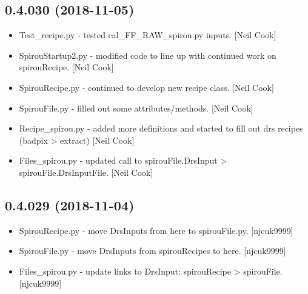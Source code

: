 \documentclass[a4paper,10pt,english]{report}
\begin{document}
\subsection{0.4.030 (2018-11-05)}
\label{\detokenize{misc/changelog:id268}}\begin{itemize}
\item {} 
Test\_recipe.py - tested cal\_FF\_RAW\_spirou.py inputs. {[}Neil Cook{]}

\item {} 
SpirouStartup2.py - modified code to line up with continued work on
spirouRecipe. {[}Neil Cook{]}

\item {} 
SpirouRecipe.py - continued to develop new recipe class. {[}Neil Cook{]}

\item {} 
SpirouFile.py - filled out some attributes/methods. {[}Neil Cook{]}

\item {} 
Recipe\_spirou.py - added more definitions and started to fill out drs
recipes (badpix \textendash{}\textgreater{} extract) {[}Neil Cook{]}

\item {} 
Files\_spirou.py - updated call to spirouFile.DrsInput \textendash{}\textgreater{}
spirouFile.DrsInputFile. {[}Neil Cook{]}

\end{itemize}


\subsection{0.4.029 (2018-11-04)}
\label{\detokenize{misc/changelog:id269}}\begin{itemize}
\item {} 
SpirouRecipe.py - move DrsInputs from here to spirouFile.py.
{[}njcuk9999{]}

\item {} 
SpirouFile.py - move DrsInputs from spirouRecipes to here. {[}njcuk9999{]}

\item {} 
Files\_spirou.py - update links to DrsInput: spirouRecipe \textendash{}\textgreater{}
spirouFile. {[}njcuk9999{]}

\end{itemize}
\end{document}
